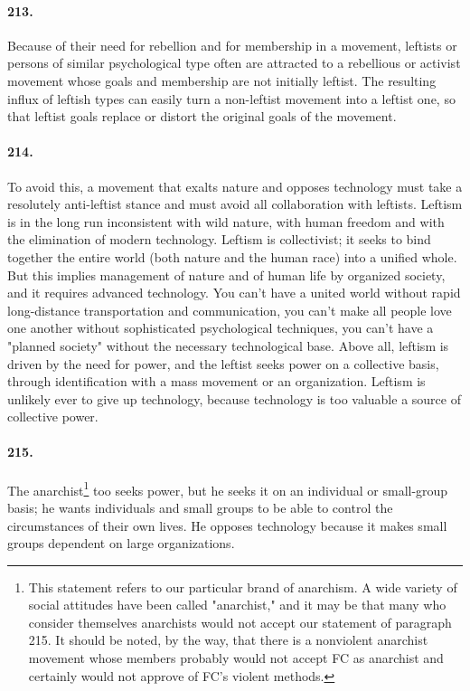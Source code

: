 \documentclass[12pt]{book}
\begin{document}
\paragraph{213.} Because of their need for rebellion and for membership in a movement, leftists or persons of similar psychological type often are attracted to a rebellious or activist movement whose goals and membership are not initially leftist. The resulting influx of leftish types can easily turn a non-leftist movement into a leftist one, so that leftist goals replace or distort the original goals of the movement.


\paragraph{214.} To avoid this, a movement that exalts nature and opposes technology must take a resolutely anti-leftist stance and must avoid all collaboration with leftists. Leftism is in the long run inconsistent with wild nature, with human freedom and with the elimination of modern technology.  Leftism is collectivist; it seeks to bind together the entire world (both nature and the human race) into a unified whole. But this implies management of nature and of human life by organized society, and it requires advanced technology. You can't have a united world without rapid long-distance transportation and communication, you can't make all people love one another without sophisticated psychological techniques, you can't have a "planned society" without the necessary technological base. Above all, leftism is driven by the need for power, and the leftist seeks power on a collective basis, through identification with a mass movement or an organization.  Leftism is unlikely ever to give up technology, because technology is too valuable a source of collective power.


\paragraph{215.} The anarchist\footnote{This statement refers to our particular brand of anarchism. A wide variety of social attitudes have been called "anarchist," and it may be that many who consider themselves anarchists would not accept our statement of paragraph 215. It should be noted, by the way, that there is a nonviolent anarchist movement whose members probably would not accept FC as anarchist and certainly would not approve of FC's violent methods.} too seeks power, but he seeks it on an individual or small-group basis; he wants individuals and small groups to be able to control the circumstances of their own lives. He opposes technology because it makes small groups dependent on large organizations.
\end{document}
